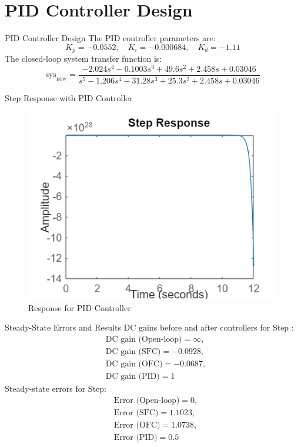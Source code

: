 \documentclass[10pt,compress,mathserif]{beamer}
\begin{document}
\section{PID Controller Design}
\begin{frame}{PID Controller Design}
The PID controller parameters are:
\[ K_p = -0.0552, \quad K_i = -0.000684, \quad K_d = -1.11 \]
The closed-loop system transfer function is:
\[
\text{sys}_{\text{now}} = \frac{-2.024s^4 - 0.1003s^3 + 49.6s^2 + 2.458s + 0.03046}{s^5 - 1.206s^4 - 31.28s^3 + 25.3s^2 + 2.458s + 0.03046}
\]
\end{frame}

\begin{frame}{Step Response with PID Controller}
\begin{figure}[H]
    \centering
    \includegraphics[scale=0.5]{PID.png}
    \caption{Response for PID Controller}
\end{figure}
\end{frame}

\begin{frame}{Steady-State Errors and Results}
    DC gains before and after controllers for Step :
    \[
    \begin{aligned}
    &\text{DC gain (Open-loop)} = \infty, \\
    &\text{DC gain (SFC)} = -0.0928, \\
    &\text{DC gain (OFC)} = -0.0687, \\
    &\text{DC gain (PID)} = 1
    \end{aligned}
    \]
    Steady-state errors for Step:
    \[
    \begin{aligned}
    &\text{Error (Open-loop)} = 0, \\
    &\text{Error (SFC)} = 1.1023, \\
    &\text{Error (OFC)} = 1.0738, \\
    &\text{Error (PID)} = 0.5
    \end{aligned}
    \]
\end{frame}
    
\end{document}
